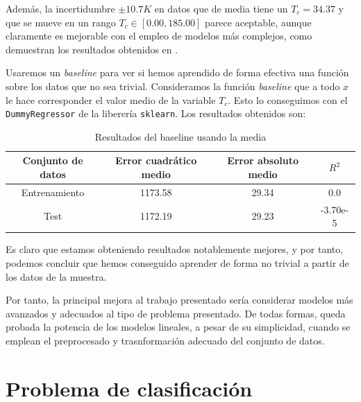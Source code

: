 \documentclass[11pt]{article}
\begin{document}
Además, la incertidumbre $\pm 10.7 K$ en datos que de media tiene un $T_c = 34.37$ y que se mueve en un rango $T_c \in [0.00, 185.00]$ parece aceptable, aunque claramente es mejorable con el empleo de modelos más complejos, como demuestran los resultados obtenidos en \cite{original_paper_reg:paper}.

Usaremos un \emph{baseline} para ver si hemos aprendido de forma efectiva una función sobre los datos que no sea trivial. Consideramos la función \emph{baseline} que a todo $x$ le hace corresponder el valor medio de la variable $T_c$. Esto lo conseguimos con el \lstinline{DummyRegressor} de la liberería \lstinline{sklearn}. Los resultados obtenidos son:

\begin{table}[H]
\centering
\begin{tabular}{|c|c|c|c|}
    \hline
    \textbf{Conjunto de datos} & \textbf{Error cuadrático medio} & \textbf{Error absoluto medio} & \textbf{$R^2$} \\
    \hline
    Entrenamiento & 1173.58 & 29.34 &  0.0 \\
    Test & 1172.19 & 29.23 & -3.70e-5 \\
    \hline
\end{tabular}
    \caption{Resultados del baseline usando la media}
\end{table}

Es claro que estamos obteniendo resultados notablemente mejores, y por tanto, podemos concluir que hemos conseguido aprender de forma no trivial a partir de los datos de la muestra.

Por tanto, la principal mejora al trabajo presentado sería considerar modelos más avanzados y adecuados al tipo de problema presentado. De todas formas, queda probada la potencia de los modelos lineales, a pesar de su simplicidad, cuando se emplean el preprocesado y trasnformación adecuado del conjunto de datos.

\pagebreak
\section{Problema de clasificación}

\pagebreak



\end{document}

